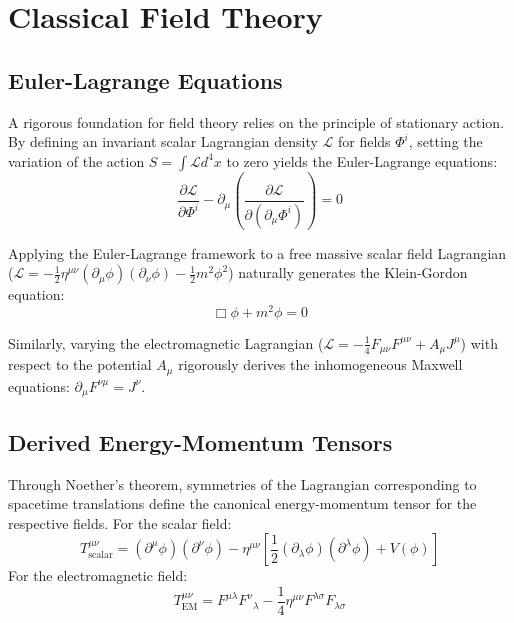 \documentclass[11pt, a4paper]{report}
\begin{document}
\section{Classical Field Theory}
\subsection*{Euler-Lagrange Equations}
A rigorous foundation for field theory relies on the principle of stationary action. By defining an invariant scalar Lagrangian density $\mathcal{L}$ for fields $\Phi^i$, setting the variation of the action $S = \int \mathcal{L} d^4x$ to zero yields the Euler-Lagrange equations:
\begin{equation}
\frac{\partial\mathcal{L}}{\partial\Phi^i} - \partial_\mu\left(\frac{\partial\mathcal{L}}{\partial(\partial_\mu\Phi^i)}\right) = 0
\end{equation}

Applying the Euler-Lagrange framework to a free massive scalar field Lagrangian ($\mathcal{L} = -\frac{1}{2}\eta^{\mu\nu}(\partial_\mu\phi)(\partial_\nu\phi) - \frac{1}{2}m^2\phi^2$) naturally generates the Klein-Gordon equation:
\begin{equation}
\Box\phi + m^2\phi = 0
\end{equation}

Similarly, varying the electromagnetic Lagrangian ($\mathcal{L} = -\frac{1}{4}F_{\mu\nu}F^{\mu\nu} + A_\mu J^\mu$) with respect to the potential $A_\mu$ rigorously derives the inhomogeneous Maxwell equations: $\partial_\mu F^{\nu\mu} = J^\nu$.

\subsection*{Derived Energy-Momentum Tensors}
Through Noether's theorem, symmetries of the Lagrangian corresponding to spacetime translations define the canonical energy-momentum tensor for the respective fields.
For the scalar field:
\begin{equation}
T^{\mu\nu}_{\text{scalar}} = (\partial^\mu\phi)(\partial^\nu\phi) - \eta^{\mu\nu}\left[\frac{1}{2}(\partial_\lambda\phi)(\partial^\lambda\phi) + V(\phi)\right]
\end{equation}
For the electromagnetic field:
\begin{equation}
T^{\mu\nu}_{\text{EM}} = {F^{\mu\lambda}}{F^\nu}_\lambda - \frac{1}{4}\eta^{\mu\nu} F^{\lambda\sigma}F_{\lambda\sigma}
\end{equation}
\end{document}
